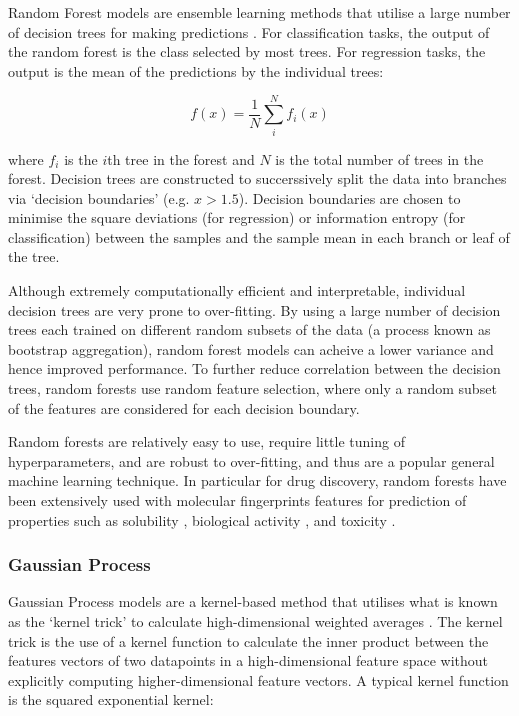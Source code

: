 Random Forest models are ensemble learning methods that utilise a large number of decision trees for making predictions \cite{Breiman2001RF}. For classification tasks, the output of the random forest is the class selected by most trees. For regression tasks, the output is the mean of the predictions by the individual trees:

\begin{equation}
    f(x) = \frac{1}{N}\sum^{N}_{i} f_{i}(x)
\end{equation}

where $f_{i}$ is the $i$th tree in the forest and $N$ is the total number of trees in the forest. Decision trees are constructed to succerssively split the data into branches via `decision boundaries' (e.g. $x > 1.5$). Decision boundaries are chosen to minimise the square deviations (for regression) or information entropy (for classification) between the samples and the sample mean in each branch or leaf of the tree. 

Although extremely computationally efficient and interpretable, individual decision trees are very prone to over-fitting. By using a large number of decision trees each trained on different random subsets of the data (a process known as bootstrap aggregation), random forest models can acheive a lower variance and hence improved performance. To further reduce correlation between the decision trees, random forests use random feature selection, where only a random subset of the features are considered for each decision boundary.  

Random forests are relatively easy to use, require little tuning of hyperparameters, and are robust to over-fitting, and thus are a popular general machine learning technique. In particular for drug discovery, random forests have been extensively used with molecular fingerprints features for prediction of properties such as solubility \cite{Palmer2007RandomForest}, biological activity \cite{Svetnik2003RandomForest, Merget2017KinaseInhibitors}, and toxicity \cite{Polishchuk2009RandomForest}.

\subsubsection{Gaussian Process}

Gaussian Process models are a kernel-based method that utilises what is known as the `kernel trick' to calculate high-dimensional weighted averages \cite{rasmussen2005gp}. The kernel trick is the use of a kernel function to calculate the inner product between the features vectors of two datapoints in a high-dimensional feature space without explicitly computing higher-dimensional feature vectors. A typical kernel function is the squared exponential kernel:

